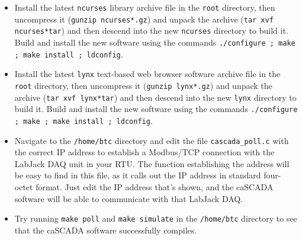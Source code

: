 \begin{itemize}
\vskip 5pt
\item{} Install the latest {\tt ncurses} library archive file in the {\tt root} directory, then uncompress it ({\tt gunzip ncurses*.gz}) and unpack the archive ({\tt tar xvf ncurses*tar}) and then descend into the new {\tt ncurses} directory to build it.  Build and install the new software using the commands {\tt ./configure ; make ; make install ; ldconfig}.
\vskip 5pt
\item{} Install the latest {\tt lynx} text-based web browser software archive file in the {\tt root} directory, then uncompress it ({\tt gunzip lynx*.gz}) and unpack the archive ({\tt tar xvf lynx*tar}) and then descend into the new {\tt lynx} directory to build it.  Build and install the new software using the commands {\tt ./configure ; make ; make install ; ldconfig}.
\vskip 5pt
\item{} Navigate to the {\tt /home/btc} directory and edit the file {\tt cascada\_poll.c} with the correct IP address to establish a Modbus/TCP connection with the LabJack DAQ unit in your RTU.  The function establishing the address will be easy to find in this file, as it calls out the IP address in standard four-octet format.  Just edit the IP address that's shown, and the caSCADA software will be able to communicate with that LabJack DAQ.
\vskip 5pt
\item{} Try running {\tt make poll} and {\tt make simulate} in the {\tt /home/btc} directory to see that the caSCADA software successfully compiles.
\end{itemize}





















